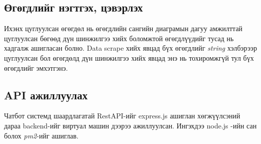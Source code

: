\subsection{Өгөгдлийг нэгтгэх, цэвэрлэх}
Ихэнх цуглуулсан өгөгдөл нь өгөгдлийн сангийн диаграмын дагуу амжилттай цуглуулсан бөгөөд дүн шинжилгээ хийх боломжтой өгөгдлүүдийг тусад нь хадгалж ашигласан болно. Data scrape хийх явцад бүх өгөгдлийг \textit{string} хэлбэрээр цуглуулсан бол өгөгдөлд дүн шинжилгээ хийх явцад энэ нь тохиромжгүй тул бүх өгөгдлийг эмхэтгэнэ.
\subsection{API ажиллуулах}
Чатбот системд шаардлагатай RestAPI-ийг express.js ашиглан хөгжүүлсэний дараа backend-ийг виртуал машин дээрээ ажиллуулсан. Ингэхдээ node.js -ийн сан болох \textit{pm2}-ийг ашиглав.
\newpage
